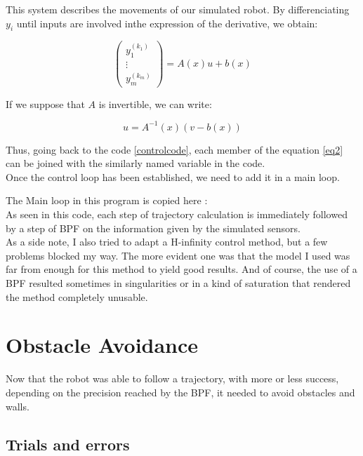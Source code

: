 This system describes the movements of our simulated robot. By differenciating $y_i$ until inputs are involved inthe expression of the derivative, we obtain:

\begin{equation}
  \begin{pmatrix}
    y_{1}^{(k_1)} \\
    \vdots \\
    y_{m}^{(k_m)}
  \end{pmatrix}
  = A(x)u + b(x)
\end{equation}

If we suppose that $A$ is invertible, we can write:

\begin{equation}
  \label{eq2}
  u = A^{-1}(x)(v - b(x))
\end{equation}

Thus, going back to the code \ref{controlcode}, each member of the equation \ref{eq2} can be joined with the similarly named variable in the code.\\

Once the control loop has been established, we need to add it in a main loop.

The Main loop in this program is copied here :\\



As seen in this code, each step of trajectory calculation is immediately followed by a step of BPF on the information given by the simulated sensors. \\


As a side note, I also tried to adapt a H-infinity control method, but a few problems blocked my way.
The more evident one was that the model I used was far from enough for this method to yield good results.
And of course, the use of a BPF resulted sometimes in singularities or in a kind of saturation that rendered the method completely unusable.


\section{Obstacle Avoidance}
Now that the robot was able to follow a trajectory, with more or less success, depending on the precision reached by the BPF, it needed to avoid obstacles and walls.


\subsection{Trials and errors}

